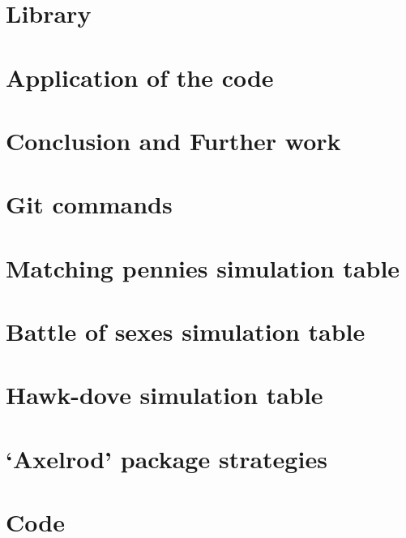\documentclass[12pt]{report}
\begin{document}
\chapter{Library}


\chapter{Application of the code}


\chapter{Conclusion and Further work}


\appendix
\chapter{Git commands}


\chapter{Matching pennies simulation table}


\chapter{Battle of sexes simulation table}


\chapter{Hawk-dove simulation table}


\chapter{`Axelrod' package strategies}


\chapter{Code}


\newpage


\end{document}
